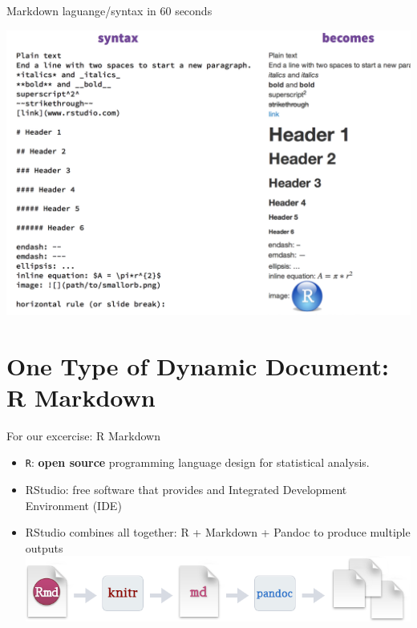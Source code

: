 \documentclass[ignorenonframetext,]{beamer}
\providecommand{\tightlist}{%
  \setlength{\itemsep}{0pt}\setlength{\parskip}{0pt}}
\begin{document}
\begin{frame}{Markdown laguange/syntax in 60 seconds}
\protect\hypertarget{markdown-laguangesyntax-in-60-seconds}{}

\includegraphics{../Images/RStudioCS.png}

\end{frame}

\hypertarget{one-type-of-dynamic-document-r-markdown}{%
\section{One Type of Dynamic Document: R
Markdown}\label{one-type-of-dynamic-document-r-markdown}}

\begin{frame}[fragile]{For our excercise: R Markdown}
\protect\hypertarget{for-our-excercise-r-markdown}{}

\begin{itemize}
\tightlist
\item
  \texttt{R}: \textbf{open source} programming language design for
  statistical analysis.\\
\item
  RStudio: free software that provides and Integrated Development
  Environment (IDE)\\
\item
  RStudio combines all together: R + Markdown + Pandoc to produce
  multiple outputs \includegraphics{../Images/RMarkdownFlow.png}
\end{itemize}

\end{frame}
\end{document}
